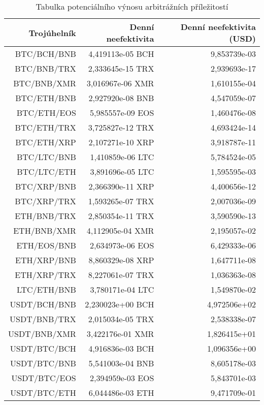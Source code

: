 \begin{table}\centering
\caption{Tabulka potenciálního výnosu arbitrážních příležitostí}
\label{table_gains}
\begin{tabular}{|| r | r | r ||}\hline Trojúhelník & Denní neefektivita & Denní neefektivita (USD)\\ [0.5ex]
 \hline\hline BTC/BCH/BNB & 4,419113e-05 BCH & 9,853739e-03\\ 
 \hline BTC/BNB/TRX & 2,333645e-15 TRX & 2,939693e-17\\ 
 \hline BTC/BNB/XMR & 3,016967e-06 XMR & 1,610155e-04\\ 
 \hline BTC/ETH/BNB & 2,927920e-08 BNB & 4,547059e-07\\ 
 \hline BTC/ETH/EOS & 5,985557e-09 EOS & 1,460476e-08\\ 
 \hline BTC/ETH/TRX & 3,725827e-12 TRX & 4,693424e-14\\ 
 \hline BTC/ETH/XRP & 2,107271e-10 XRP & 3,918787e-11\\ 
 \hline BTC/LTC/BNB & 1,410859e-06 LTC & 5,784524e-05\\ 
 \hline BTC/LTC/ETH & 3,891696e-05 LTC & 1,595595e-03\\ 
 \hline BTC/XRP/BNB & 2,366390e-11 XRP & 4,400656e-12\\ 
 \hline BTC/XRP/TRX & 1,593265e-07 TRX & 2,007036e-09\\ 
 \hline ETH/BNB/TRX & 2,850354e-11 TRX & 3,590590e-13\\ 
 \hline ETH/BNB/XMR & 4,112905e-04 XMR & 2,195057e-02\\ 
 \hline ETH/EOS/BNB & 2,634973e-06 EOS & 6,429333e-06\\ 
 \hline ETH/XRP/BNB & 8,860329e-08 XRP & 1,647711e-08\\ 
 \hline ETH/XRP/TRX & 8,227061e-07 TRX & 1,036363e-08\\ 
 \hline LTC/ETH/BNB & 3,780171e-04 LTC & 1,549870e-02\\ 
 \hline USDT/BCH/BNB & 2,230023e+00 BCH & 4,972506e+02\\ 
 \hline USDT/BNB/TRX & 2,015034e-05 TRX & 2,538338e-07\\ 
 \hline USDT/BNB/XMR & 3,422176e-01 XMR & 1,826415e+01\\ 
 \hline USDT/BTC/BCH & 4,916836e-03 BCH & 1,096356e+00\\ 
 \hline USDT/BTC/BNB & 5,541003e-04 BNB & 8,605178e-03\\ 
 \hline USDT/BTC/EOS & 2,394959e-03 EOS & 5,843701e-03\\ 
 \hline USDT/BTC/ETH & 6,044486e-03 ETH & 9,471709e-01\\ 

\end{tabular}
\end{table}

